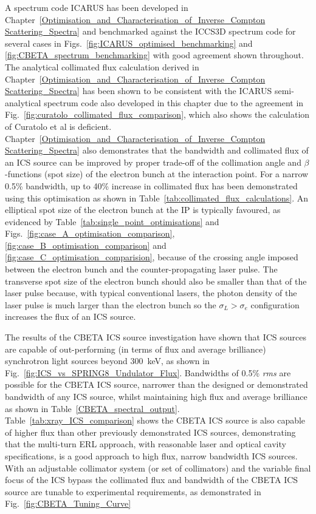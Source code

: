 \documentclass[../main.tex]{subfiles}
\begin{document}
A spectrum code \textsc{ICARUS} has been developed in Chapter~\ref{Optimisation_and_Characterisation_of_Inverse_Compton Scattering_Spectra} and benchmarked against the \textsc{ICCS3D} spectrum code for several cases in Figs.~\ref{fig:ICARUS_optimised_benchmarking} and \ref{fig:CBETA_spectrum_benchmarking} with good agreement shown throughout. The analytical collimated flux calculation derived in Chapter~\ref{Optimisation_and_Characterisation_of_Inverse_Compton Scattering_Spectra} has been shown to be consistent with the \textsc{ICARUS} semi-analytical spectrum code also developed in this chapter due to the agreement in Fig.~\ref{fig:curatolo_collimated_flux_comparison}, which also shows the calculation of Curatolo et al \cite{curatolo2017analytical} is deficient. Chapter~\ref{Optimisation_and_Characterisation_of_Inverse_Compton Scattering_Spectra} also demonstrates that the bandwidth and collimated flux of an ICS source can be improved by proper trade-off of the collimation angle and $\beta$-functions (spot size) of the electron bunch at the interaction point. For a narrow 0.5\% bandwidth, up to 40\% increase in collimated flux has been demonstrated using this optimisation as shown in Table~\ref{tab:collimated_flux_calculations}. An elliptical spot size of the electron bunch at the IP is typically favoured, as evidenced by Table~\ref{tab:single_point_optimisations} and Figs.~\ref{fig:case_A_optimisation_comparison}, \ref{fig:case_B_optimisation_comparison} and \ref{fig:case_C_optimisation_comparision}, because of the crossing angle imposed between the electron bunch and the counter-propagating laser pulse. The transverse spot size of the electron bunch should also be smaller than that of the laser pulse because, with typical conventional lasers, the photon density of the laser pulse is much larger than the electron bunch so the $\sigma_{L}>\sigma_{e}$ configuration increases the flux of an ICS source. 

The results of the CBETA ICS source investigation have shown that ICS sources are capable of out-performing (in terms of flux and average brilliance) synchrotron light sources beyond 300~\si{\kilo\electronvolt}, as shown in Fig.~\ref{fig:ICS_vs_SPRING8_Undulator_Flux}. Bandwidths of 0.5\% \textit{rms} are possible for the CBETA ICS source, narrower than the designed or demonstrated bandwidth of any ICS source, whilst maintaining high flux and average brilliance as shown in Table~\ref{CBETA_spectral_output}. Table~\ref{tab:xray_ICS_comparison} shows the CBETA ICS source is also capable of higher flux than other previously demonstrated ICS sources, demonstrating that the multi-turn ERL approach, with reasonable laser and optical cavity specifications, is a good approach to high flux, narrow bandwidth ICS sources. With an adjustable collimator system (or set of collimators) and the variable final focus of the ICS bypass the collimated flux and bandwidth of the CBETA ICS source are tunable to experimental requirements, as demonstrated in Fig.~\ref{fig:CBETA_Tuning_Curve}   
\end{document}
